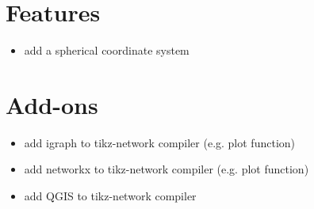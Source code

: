 \documentclass[a4paper,twosided,notoc]{tufte-book}
\begin{document}
\section{Features}
\begin{itemize}
\item add a spherical coordinate system
\end{itemize}

\section{Add-ons}
\begin{itemize}
\item add igraph to tikz-network compiler (e.g. plot function)
\item add networkx to tikz-network compiler (e.g. plot function)
\item add QGIS to tikz-network compiler
\end{itemize}








\backmatter





\printindex
\end{document}
